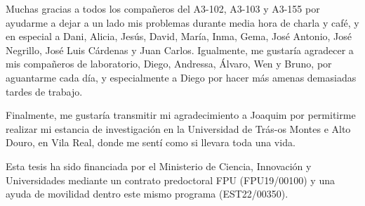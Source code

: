 \noindent Muchas gracias a todos los compañeros del A3-102, A3-103 y A3-155 por ayudarme a dejar a un lado mis problemas durante media hora de charla y café, y en especial a Dani, Alicia, Jesús, David, María, Inma, Gema, José Antonio, José Negrillo, José Luis Cárdenas y Juan Carlos. Igualmente, me gustaría agradecer a mis compañeros de laboratorio, Diego, Andressa, Álvaro, Wen y Bruno, por aguantarme cada día, y especialmente a Diego por hacer más amenas demasiadas tardes de trabajo. 

\noindent Finalmente, me gustaría transmitir mi agradecimiento a Joaquim por permitirme realizar mi estancia de investigación en la Universidad de Trás-os Montes e Alto Douro, en Vila Real, donde me sentí como si llevara toda una vida. 

\vspace{50mm} 

\noindent Esta tesis ha sido financiada por el Ministerio de Ciencia, Innovación y Universidades mediante un contrato predoctoral FPU (FPU19/00100) y una ayuda de movilidad dentro este mismo programa (EST22/00350).  

